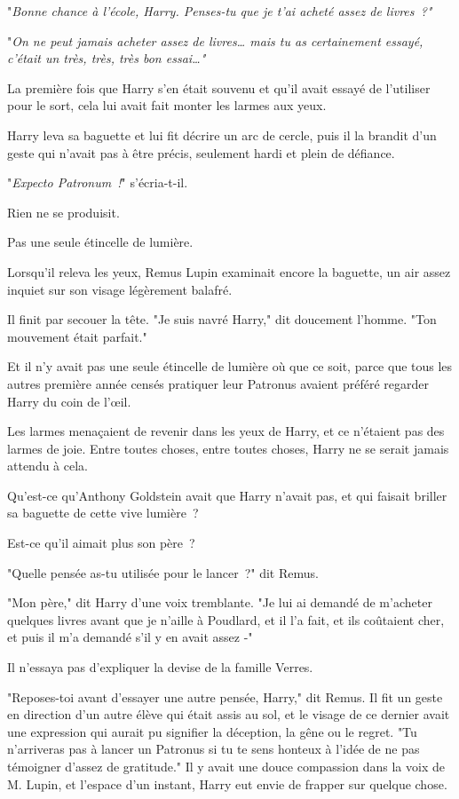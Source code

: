 "\emph{Bonne chance à l'école, Harry. Penses-tu que je t'ai acheté assez de livres~?"}

"\emph{On ne peut jamais acheter assez de livres… mais tu as certainement essayé, c'était un très, très, très bon essai…"}

La première fois que Harry s'en était souvenu et qu'il avait essayé de l'utiliser pour le sort, cela lui avait fait monter les larmes aux yeux.

Harry leva sa baguette et lui fit décrire un arc de cercle, puis il la brandit d'un geste qui n'avait pas à être précis, seulement hardi et plein de défiance.

"\emph{Expecto Patronum~!}" s'écria-t-il.

Rien ne se produisit.

Pas une seule étincelle de lumière.

Lorsqu'il releva les yeux, Remus Lupin examinait encore la baguette, un air assez inquiet sur son visage légèrement balafré.

Il finit par secouer la tête. "Je suis navré Harry," dit doucement l'homme. "Ton mouvement était parfait."

Et il n'y avait pas une seule étincelle de lumière où que ce soit, parce que tous les autres première année censés pratiquer leur Patronus avaient préféré regarder Harry du coin de l'œil.

Les larmes menaçaient de revenir dans les yeux de Harry, et ce n'étaient pas des larmes de joie. Entre toutes choses, entre toutes choses, Harry ne se serait jamais attendu à cela.

Qu'est-ce qu'Anthony Goldstein avait que Harry n'avait pas, et qui faisait briller sa baguette de cette vive lumière~?

Est-ce qu'il aimait plus son père~?

"Quelle pensée as-tu utilisée pour le lancer~?" dit Remus.

"Mon père," dit Harry d'une voix tremblante. "Je lui ai demandé de m'acheter quelques livres avant que je n'aille à Poudlard, et il l'a fait, et ils coûtaient cher, et puis il m'a demandé s'il y en avait assez -"

Il n'essaya pas d'expliquer la devise de la famille Verres.

"Reposes-toi avant d'essayer une autre pensée, Harry," dit Remus. Il fit un geste en direction d'un autre élève qui était assis au sol, et le visage de ce dernier avait une expression qui aurait pu signifier la déception, la gêne ou le regret. "Tu n'arriveras pas à lancer un Patronus si tu te sens honteux à l'idée de ne pas témoigner d'assez de gratitude." Il y avait une douce compassion dans la voix de M. Lupin, et l'espace d'un instant, Harry eut envie de frapper sur quelque chose.

